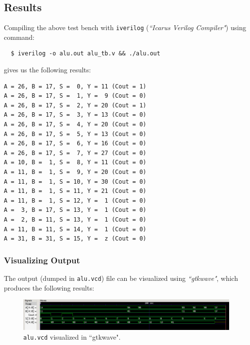 \documentclass[12pt]{article}
\begin{document}
\newpage

\subsection{Results}

Compiling the above test bench with \texttt{iverilog} (\textit{``Icarus Verilog
Compiler"}) using command:

\begin{verbatim}
  $ iverilog -o alu.out alu_tb.v && ./alu.out
\end{verbatim}

gives us the following results:

\begin{verbatim}
A = 26, B = 17, S =  0, Y = 11 (Cout = 1)
A = 26, B = 17, S =  1, Y =  9 (Cout = 0)
A = 26, B = 17, S =  2, Y = 20 (Cout = 1)
A = 26, B = 17, S =  3, Y = 13 (Cout = 0)
A = 26, B = 17, S =  4, Y = 20 (Cout = 0)
A = 26, B = 17, S =  5, Y = 13 (Cout = 0)
A = 26, B = 17, S =  6, Y = 16 (Cout = 0)
A = 26, B = 17, S =  7, Y = 27 (Cout = 0)
A = 10, B =  1, S =  8, Y = 11 (Cout = 0)
A = 11, B =  1, S =  9, Y = 20 (Cout = 0)
A = 11, B =  1, S = 10, Y = 30 (Cout = 0)
A = 11, B =  1, S = 11, Y = 21 (Cout = 0)
A = 11, B =  1, S = 12, Y =  1 (Cout = 0)
A =  3, B = 17, S = 13, Y =  1 (Cout = 0)
A =  2, B = 11, S = 13, Y =  1 (Cout = 0)
A = 11, B = 11, S = 14, Y =  1 (Cout = 0)
A = 31, B = 31, S = 15, Y =  z (Cout = 0)
\end{verbatim}

\subsubsection{Visualizing Output}
The output (dumped in \texttt{alu.vcd}) file can be visualized using
\textit{``gtkwave"}, which produces the following results:

\begin{figure}[H]
  \centering
  \includegraphics[width=\columnwidth]{img/alu.png}
  \caption{\texttt{alu.vcd} visualized in ``gtkwave".}
  \label{fig:alu}
\end{figure}
\end{document}
